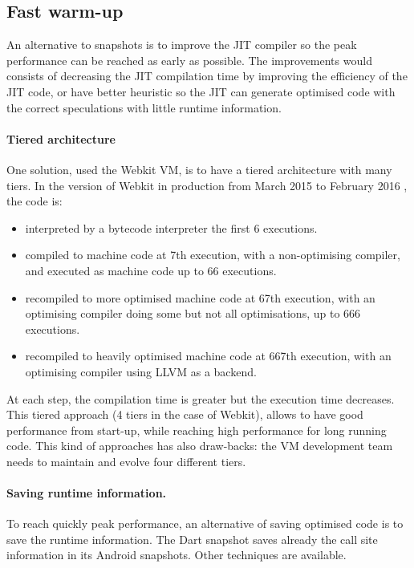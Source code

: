 \documentclass[a4paper,12pt,twoside]{../includes/ThesisStyle}
\begin{document}
\subsection{Fast warm-up}

An alternative to snapshots is to improve the JIT compiler so the peak performance can be reached as early as possible. The improvements would consists of decreasing the JIT compilation time by improving the efficiency of the JIT code, or have better heuristic so the JIT can generate optimised code with the correct speculations with little runtime information.

\paragraph{Tiered architecture}
One solution, used the Webkit VM\cite{Webkit15}, is to have a tiered architecture with many tiers. In the version of Webkit in production from March 2015 to February 2016 \cite{Webkit15}, the code is:
\begin{itemize}
\item interpreted by a bytecode interpreter the first 6 executions.
\item compiled to machine code at 7th execution, with a non-optimising compiler, and executed as machine code up to 66 executions.
\item recompiled to more optimised machine code at 67th execution, with an optimising compiler doing some but not all optimisations, up to 666 executions.
\item recompiled to heavily optimised machine code at 667th execution, with an optimising compiler using LLVM as a backend.
\end{itemize}

At each step, the compilation time is greater but the execution time decreases. This tiered approach (4 tiers in the case of Webkit), allows to have good performance from start-up, while reaching high performance for long running code. This kind of approaches has also draw-backs: the VM development team needs to maintain and evolve four different tiers.

\paragraph{Saving runtime information.}

To reach quickly peak performance, an alternative of saving optimised code is to save the runtime information. The Dart snapshot saves already the call site information in its Android snapshots. Other techniques are available.
\end{document}
